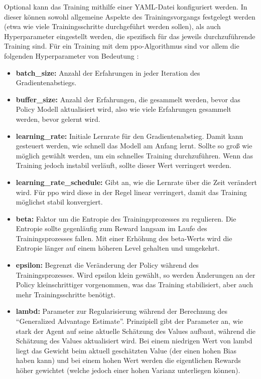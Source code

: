 Optional kann das Training mithilfe einer YAML-Datei konfiguriert werden.
In dieser können sowohl allgemeine Aspekte des Trainingsvorgangs festgelegt werden (etwa wie viele Trainingsschritte durchgeführt werden sollen), als auch Hyperparameter eingestellt werden, die spezifisch für das jeweils durchzuführende Training sind.
Für ein Training mit dem \ac{ppo}-Algorithmus sind vor allem die folgenden Hyperparameter von Bedeutung \cite{mlagentsHyperparameter}:
\begin{itemize}
    \item \textbf{batch\_size:} Anzahl der Erfahrungen in jeder Iteration des Gradientenabstiegs.
    \item \textbf{buffer\_size:} Anzahl der Erfahrungen, die gesammelt werden, bevor das Policy Modell aktualisiert wird, also wie viele Erfahrungen gesammelt werden, bevor gelernt wird.
    \item \textbf{learning\_rate:} Initiale Lernrate für den Gradientenabstieg.
    Damit kann gesteuert werden, wie schnell das Modell am Anfang lernt.
    Sollte so groß wie möglich gewählt werden, um ein schnelles Training durchzuführen.
    Wenn das Training jedoch instabil verläuft, sollte dieser Wert verringert werden.
    \item \textbf{learning\_rate\_schedule:} Gibt an, wie die Lernrate über die Zeit verändert wird.
    Für \ac{ppo} wird diese in der Regel linear verringert, damit das Training möglichst stabil konvergiert.
    \item \textbf{beta:} Faktor um die Entropie des Trainingsprozesses zu regulieren.
    Die Entropie sollte gegenläufig zum Reward langsam im Laufe des Trainingsprozesses fallen.
    Mit einer Erhöhung des beta-Werts wird die Entropie länger auf einem höheren Level gehalten und umgekehrt.
    \item \textbf{epsilon:} Begrenzt die Veränderung der Policy während des Trainingsprozesses.
    Wird epsilon klein gewählt, so werden Änderungen an der Policy kleinschrittiger vorgenommen, was das Training stabilisiert, aber auch mehr Trainingsschritte benötigt.
    \item \textbf{lambd:} Parameter zur Regularisierung während der Berechnung des \enquote{Generalized Advantage Estimate}.
    Prinzipiell gibt der Parameter an, wie stark der Agent auf seine aktuelle Schätzung des Values aufbaut, während die Schätzung des Values aktualisiert wird.
    Bei einem niedrigen Wert von lambd liegt das Gewicht beim aktuell geschätzten Value (der einen hohen Bias haben kann) und bei einem hohen Wert werden die eigentlichen Rewards höher gewichtet (welche jedoch einer hohen Varianz unterliegen können).

\end{itemize}
